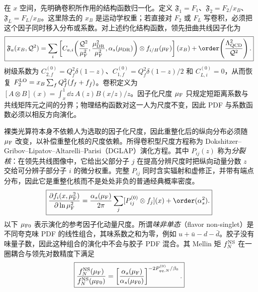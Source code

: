 在 $x$ 空间，先明确卷积所作用的结构函数归一化。定义 $\mathfrak F_1=F_1$、$\mathfrak F_2=F_2/x_B$、$\mathfrak F_L=F_L/x_B$。这里除去的 $x_B$ 是运动学权重；若直接对 $F_2$ 或 $F_L$ 写卷积，必须把这个因子同时移入分布或系数。对上述约化结构函数，领先扭曲共线因子化为
\begin{equation}
 \boxed{
 \mathfrak F_a(x_B,\mathcal Q^2)
 =\sum_i\left[
 C_{a,i}\!\left(
 \frac{\mathcal Q^2}{\mu_{\rm F}^2},
 \frac{\mu_{\rm DR}^2}{\mu_{\rm F}^2},
 \alpha_s(\mu_{\rm DR})\right)
 \otimes f_{i/H}(\mu_{\rm F})\right](x_B)
 +\order\!\left(\frac{\Lambda_{\rm QCD}^2}{\mathcal Q^2}\right).}
 \label{eq:dis-collinear-factorization-dp14}
\end{equation}
树级系数为 $C_{2,f}^{(0)}=Q_f^2\delta(1-z)$、$C_{1,f}^{(0)}=Q_f^2\delta(1-z)/2$ 和 $C_{L,i}^{(0)}=0$，从而恢复 $F_2^{\rm LO}=x_B\sum_fQ_f^2(f_f+f_{\bar f})$。卷积定义为 $[A\otimes B](x)=\int_x^1\dd z\,A(z)B(x/z)/z$。因子化尺度 $\mu_{\rm F}$ 只规定短距离系数与共线矩阵元之间的分界；物理结构函数对这一人为尺度不变，因此 PDF 与系数函数必须以相反方向演化。

裸类光算符本身不依赖人为选取的因子化尺度，因此重整化后的纵向分布必须随 $\mu_{\rm F}$ 改变，以补偿重整化核的尺度依赖。所得卷积型尺度方程称为 Dokshitzer--Gribov--Lipatov--Altarelli--Parisi（DGLAP）演化方程。其中 $P_{ij}(z)$ 称为\emph{分裂核}：在领先共线图像中，它给出父部分子 $j$ 在提高分辨尺度时把纵向动量分数 $z$ 交给可分辨子部分子 $i$ 的微分权重。完整 $P_{ij}$ 同时含实辐射和虚修正，并带有端点分布，因此它是重整化核而不是处处非负的普通经典概率密度。
\begin{equation}
 \boxed{
 \frac{\partial f_i(x,\mu_{\rm F}^2)}{\partial\ln\mu_{\rm F}^2}
 =\frac{\alpha_s(\mu_{\rm F})}{2\pi}
 \sum_j[P_{ij}^{(0)}\otimes f_j](x)
 +\order(\alpha_s^2).}
 \label{eq:dglap-general-evolution-dp68}
\end{equation}
以下 $\mu_{\rm F0}$ 表示演化的参考因子化动量尺度。所谓\emph{味非单态}（flavor non-singlet）是不同夸克味 PDF 的线性组合，其味系数之和为零，例如 $u+\bar u-d-\bar d$。胶子没有味量子数，因此这种组合的演化中不会与胶子 PDF 混合。其 Mellin 矩 $f_N^{\rm NS}$ 在一圈耦合与领先对数精度下满足
\begin{equation}
 \boxed{
 \frac{f_N^{\rm NS}(\mu_{\rm F})}{f_N^{\rm NS}(\mu_{\rm F0})}
 =\left[
 \frac{\alpha_s(\mu_{\rm F})}{\alpha_s(\mu_{\rm F0})}
 \right]^{-2P_{qq,N}^{(0)}/\beta_0}.}
 \label{eq:dglap-mellin-solution-dp13}
\end{equation}


